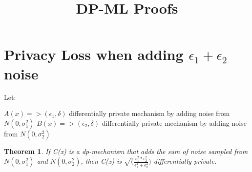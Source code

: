 \documentclass{article}
\title{DP-ML Proofs}
\newtheorem{theorem}{Theorem}[section]
\theoremstyle{remark}
\theoremstyle{definition}
\begin{document}
\maketitle



\section{Privacy Loss when adding $\epsilon_{1} + \epsilon_{2}$ noise}

Let:

$A(x) => (\epsilon_{1}, \delta)$ differentially private mechanism by adding noise from $N(0, \sigma_{1}^{2})$
$B(x) => (\epsilon_{2}, \delta)$ differentially private mechanism by adding noise from $N(0, \sigma_{2}^{2})$

\begin{theorem}
If C(x) is a dp-mechanism that adds the sum of noise sampled from $N(0, \sigma_{1}^{2})$ and $N(0, \sigma_{2}^{2})$, then C(x) is $\sqrt(\frac{\epsilon_{1}^{2}*\epsilon_{2}^{2}}{\epsilon_{1}^{2} + \epsilon_{2}^{2}})$ differentially private.

\end{theorem}
\end{document}
